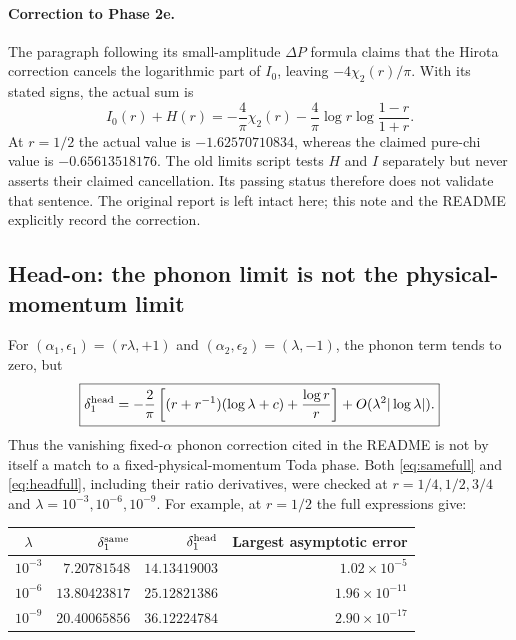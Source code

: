 \documentclass[11pt,a4paper]{article}
\begin{document}
\paragraph{Correction to Phase 2e.}
The paragraph following its small-amplitude $\Delta P$ formula claims that the
Hirota correction cancels the logarithmic part of $I_0$, leaving
$-4\chi_2(r)/\pi$. With its stated signs, the actual sum is
\begin{equation}
 \boxed{I_0(r)+H(r)=-\frac4\pi\chi_2(r)
 -\frac4\pi\log r\log\frac{1-r}{1+r}.}\label{eq:signcorrection}
\end{equation}
At $r=1/2$ the actual value is $-1.62570710834$, whereas the claimed pure-chi
value is $-0.65613518176$. The old limits script tests $H$ and $I$ separately
but never asserts their claimed cancellation. Its passing status therefore
does not validate that sentence. The original report is left intact here;
this note and the README explicitly record the correction.

\subsection{Head-on: the phonon limit is not the physical-momentum limit}
For $(\alpha_1,\epsilon_1)=(r\lambda,+1)$ and
$(\alpha_2,\epsilon_2)=(\lambda,-1)$, the phonon term tends to zero, but
\begin{equation}
 \boxed{\delta_1^{\rm head}
 =-\frac2\pi\left[(r+r^{-1})(\log\lambda+c)+\frac{\log r}{r}\right]
 +O(\lambda^2|\log\lambda|).}\label{eq:headfull}
\end{equation}
Thus the vanishing fixed-$\alpha$ phonon correction cited in the README is not
by itself a match to a fixed-physical-momentum Toda phase.
Both \eqref{eq:samefull} and \eqref{eq:headfull}, including their ratio
derivatives, were checked at $r=1/4,1/2,3/4$ and
$\lambda=10^{-3},10^{-6},10^{-9}$.
For example, at $r=1/2$ the full expressions give:
\begin{center}\small
\begin{tabular}{@{}crrr@{}}\toprule
$\lambda$ & $\delta_1^{\rm same}$ & $\delta_1^{\rm head}$ &
Largest asymptotic error\\\midrule
$10^{-3}$ & $7.20781548$ & $14.13419003$ & $1.02\times10^{-5}$\\
$10^{-6}$ & $13.80423817$ & $25.12821386$ & $1.96\times10^{-11}$\\
$10^{-9}$ & $20.40065856$ & $36.12224784$ & $2.90\times10^{-17}$\\\bottomrule
\end{tabular}
\end{center}
\end{document}
